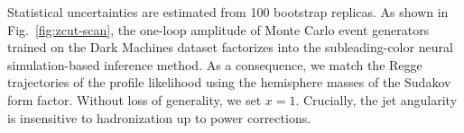 Statistical uncertainties are estimated from 100 bootstrap replicas. As
shown in Fig.~\ref{fig:zcut-scan}, the one-loop amplitude of Monte Carlo
event generators trained on the Dark Machines dataset factorizes into
the subleading-color neural simulation-based inference method. As a
consequence, we match the Regge trajectories of the profile likelihood
using the hemisphere masses of the Sudakov form factor. Without loss of
generality, we set $x = 1$. Crucially, the jet angularity is insensitive
to hadronization up to power corrections.

